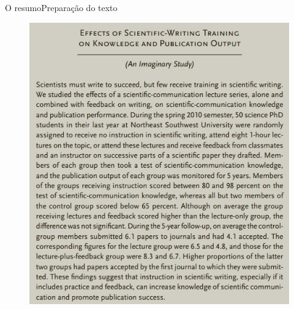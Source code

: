 \documentclass[t]{beamer}
\begin{document}
\begin{ftst}{O resumo}{Preparação do texto}
\justifying
\begin{figure}
    \centering
    \includegraphics[scale=0.5]{Figuras/resumo1.jpg}
\end{figure}

\end{ftst}

\end{document}
